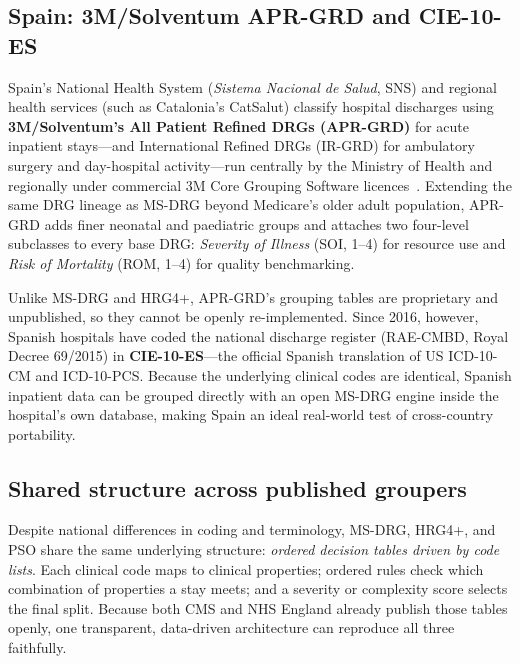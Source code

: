 \documentclass[fleqn,10pt]{IOMEDArticle}
\begin{document}
\subsection{Spain: 3M/Solventum APR-GRD and CIE-10-ES}

Spain's National Health System (\emph{Sistema Nacional de Salud}, SNS) and regional health services (such as Catalonia's CatSalut) classify hospital discharges using \textbf{3M/Solventum's All Patient Refined DRGs (APR-GRD)} for acute inpatient stays---and International Refined DRGs (IR-GRD) for ambulatory surgery and day-hospital activity---run centrally by the Ministry of Health and regionally under commercial 3M Core Grouping Software licences~\cite{averill2003drg}. Extending the same DRG lineage as MS-DRG beyond Medicare's older adult population, APR-GRD adds finer neonatal and paediatric groups and attaches two four-level subclasses to every base DRG: \emph{Severity of Illness} (SOI, 1--4) for resource use and \emph{Risk of Mortality} (ROM, 1--4) for quality benchmarking.

Unlike MS-DRG and HRG4+, APR-GRD's grouping tables are proprietary and unpublished, so they cannot be openly re-implemented. Since 2016, however, Spanish hospitals have coded the national discharge register (RAE-CMBD, Royal Decree 69/2015) in \textbf{CIE-10-ES}---the official Spanish translation of US ICD-10-CM and ICD-10-PCS. Because the underlying clinical codes are identical, Spanish inpatient data can be grouped directly with an open MS-DRG engine inside the hospital's own database, making Spain an ideal real-world test of cross-country portability.

\subsection{Shared structure across published groupers}

Despite national differences in coding and terminology, MS-DRG, HRG4+, and PSO share the same underlying structure: \emph{ordered decision tables driven by code lists}. Each clinical code maps to clinical properties; ordered rules check which combination of properties a stay meets; and a severity or complexity score selects the final split. Because both CMS and NHS England already publish those tables openly, one transparent, data-driven architecture can reproduce all three faithfully.

\end{document}
